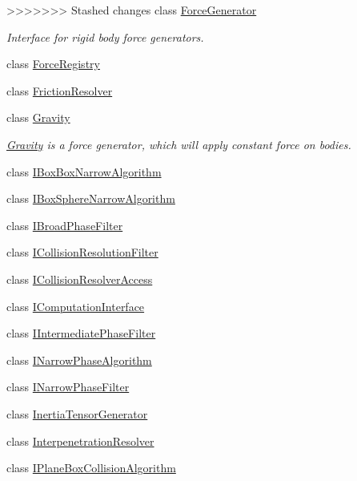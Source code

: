 \begin{DoxyCompactItemize}
>>>>>>> Stashed changes
class \mbox{\hyperlink{classr3_1_1_force_generator}{Force\+Generator}}
\begin{DoxyCompactList}\small\item\em Interface for rigid body force generators. \end{DoxyCompactList}\item 
class \mbox{\hyperlink{classr3_1_1_force_registry}{Force\+Registry}}
\item 
class \mbox{\hyperlink{classr3_1_1_friction_resolver}{Friction\+Resolver}}
\item 
class \mbox{\hyperlink{classr3_1_1_gravity}{Gravity}}
\begin{DoxyCompactList}\small\item\em \mbox{\hyperlink{classr3_1_1_gravity}{Gravity}} is a force generator, which will apply constant force on bodies. \end{DoxyCompactList}\item 
class \mbox{\hyperlink{classr3_1_1_i_box_box_narrow_algorithm}{I\+Box\+Box\+Narrow\+Algorithm}}
\item 
class \mbox{\hyperlink{classr3_1_1_i_box_sphere_narrow_algorithm}{I\+Box\+Sphere\+Narrow\+Algorithm}}
\item 
class \mbox{\hyperlink{classr3_1_1_i_broad_phase_filter}{I\+Broad\+Phase\+Filter}}
\item 
class \mbox{\hyperlink{classr3_1_1_i_collision_resolution_filter}{I\+Collision\+Resolution\+Filter}}
\item 
class \mbox{\hyperlink{classr3_1_1_i_collision_resolver_access}{I\+Collision\+Resolver\+Access}}
\item 
class \mbox{\hyperlink{classr3_1_1_i_computation_interface}{I\+Computation\+Interface}}
\item 
class \mbox{\hyperlink{classr3_1_1_i_intermediate_phase_filter}{I\+Intermediate\+Phase\+Filter}}
\item 
class \mbox{\hyperlink{classr3_1_1_i_narrow_phase_algorithm}{I\+Narrow\+Phase\+Algorithm}}
\item 
class \mbox{\hyperlink{classr3_1_1_i_narrow_phase_filter}{I\+Narrow\+Phase\+Filter}}
\item 
class \mbox{\hyperlink{classr3_1_1_inertia_tensor_generator}{Inertia\+Tensor\+Generator}}
\item 
class \mbox{\hyperlink{classr3_1_1_interpenetration_resolver}{Interpenetration\+Resolver}}
\item 
class \mbox{\hyperlink{classr3_1_1_i_plane_box_collision_algorithm}{I\+Plane\+Box\+Collision\+Algorithm}}

\end{DoxyCompactItemize}
